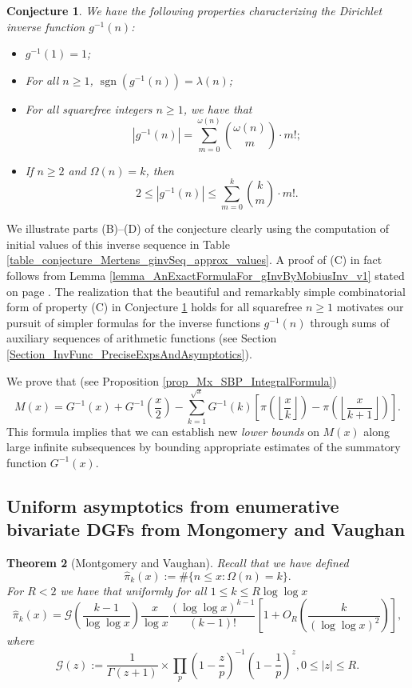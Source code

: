 \documentclass[11pt,reqno,a4letter]{article}
\numberwithin{figure}{section}
\numberwithin{table}{section}
\newcommand{\Floor}[2]{\ensuremath{\left\lfloor \frac{#1}{#2} \right\rfloor}}
\theoremstyle{plain}
\newtheorem{theorem}{Theorem}
\newtheorem{conjecture}[theorem]{Conjecture}
\numberwithin{theorem}{section}
\theoremstyle{definition}
\newcommand{\NBRef}[1]{}
\begin{document}
\NBRef{A01-2020-04-26}
\begin{conjecture}
\label{lemma_gInv_MxExample} 
We have the following properties characterizing the 
Dirichlet inverse function $g^{-1}(n)$: 
\begin{itemize} 

\item[\textbf{(A)}] $g^{-1}(1) = 1$; 
\item[\textbf{(B)}] For all $n \geq 1$, $\operatorname{sgn}(g^{-1}(n)) = \lambda(n)$; 
\item[\textbf{(C)}] For all squarefree integers $n \geq 1$, we have that 
     \[
     |g^{-1}(n)| = \sum_{m=0}^{\omega(n)} \binom{\omega(n)}{m} \cdot m!; 
     \]
\item[\textbf{(D)}] If $n \geq 2$ and $\Omega(n) = k$, then 
     \[
     2 \leq |g^{-1}(n)| \leq \sum_{m=0}^{k} \binom{k}{m} \cdot m!. 
     \]
\end{itemize} 
\end{conjecture} 

We illustrate parts (B)--(D) of the conjecture clearly using the computation of initial values of 
this inverse sequence in 
Table \ref{table_conjecture_Mertens_ginvSeq_approx_values}. 
A proof of (C) in fact follows from 
Lemma \ref{lemma_AnExactFormulaFor_gInvByMobiusInv_v1} 
stated on page \pageref{lemma_AnExactFormulaFor_gInvByMobiusInv_v1}. 
The realization that the beautiful and remarkably simple combinatorial form of property (C) 
in Conjecture \ref{lemma_gInv_MxExample} holds for all squarefree $n \geq 1$ 
motivates our pursuit of simpler formulas for the inverse functions $g^{-1}(n)$ 
through sums of auxiliary sequences of arithmetic functions 
(see Section \ref{Section_InvFunc_PreciseExpsAndAsymptotics}). 

We prove that (see Proposition \ref{prop_Mx_SBP_IntegralFormula}) 
\[
M(x) = G^{-1}(x) + G^{-1}\left(\frac{x}{2}\right) - 
     \sum_{k=1}^{\sqrt{x}} G^{-1}(k) \left[ 
     \pi\left(\Floor{x}{k}\right) - \pi\left(\Floor{x}{k+1}\right) 
     \right]. 
\]
This formula 
implies that we can establish new \emph{lower bounds} on $M(x)$ along large infinite subsequences 
by bounding appropriate estimates of the summatory function $G^{-1}(x)$. 

\subsection{Uniform asymptotics from enumerative bivariate DGFs from Mongomery and Vaughan} 

\begin{theorem}[Montgomery and Vaughan]
\label{theorem_HatPi_ExtInTermsOfGz} 
Recall that we have defined 
$$\widehat{\pi}_k(x) := \#\{n \leq x: \Omega(n)=k\}.$$ 
For $R < 2$ we have that uniformly for all $1 \leq k \leq R \log\log x$ 
\[
\widehat{\pi}_k(x) = \mathcal{G}\left(\frac{k-1}{\log\log x}\right) \frac{x}{\log x} 
     \frac{(\log\log x)^{k-1}}{(k-1)!} \left[1 + O_R\left(\frac{k}{(\log\log x)^2}\right)\right], 
\]
where 
\[
\mathcal{G}(z) := \frac{1}{\Gamma(z+1)} \times 
     \prod_p \left(1-\frac{z}{p}\right)^{-1} \left(1-\frac{1}{p}\right)^z, 0 \leq |z| \leq R. 
\]
\end{theorem} 
\end{document}
